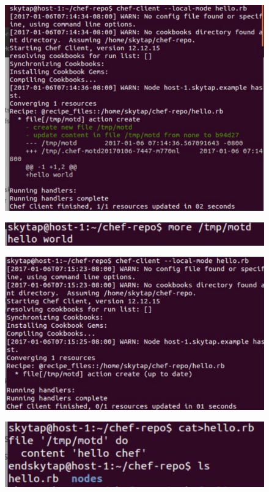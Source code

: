 \documentclass[12pt,letterpaper,boxed]{hmcpset}
\begin{document}
\begin{figure}[H]
  \centering
  \includegraphics[width = 1.0\textwidth]{4.png}
\end{figure}
\begin{figure}[H]
  \centering
  \includegraphics[width = 1.0\textwidth]{5.png}
\end{figure}
\begin{figure}[H]
  \centering
  \includegraphics[width = 1.0\textwidth]{6.png}
\end{figure}
\begin{figure}[H]
  \centering
  \includegraphics[width = 1.0\textwidth]{7.png}
\end{figure}
\end{document}
